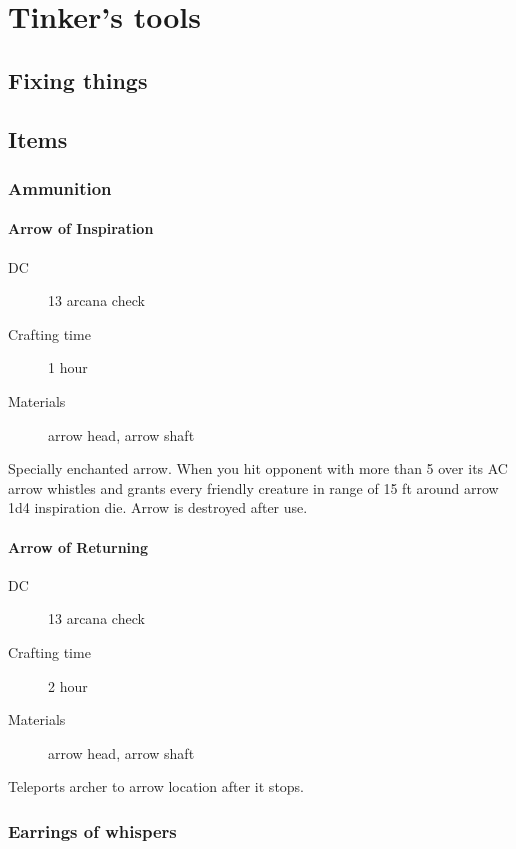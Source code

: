 \chapter{Tinker's tools}

\section{Fixing things}

\section{Items}

\subsection{Ammunition}

\subsubsection{Arrow of Inspiration}

\begin{description}
\item [DC] 13 arcana check
\item [Crafting time] 1 hour
\item [Materials] arrow head, arrow shaft
\end{description}

Specially enchanted arrow. When you hit opponent with more than 5 over its AC arrow whistles and grants every friendly creature in range of 15 ft around arrow 1d4 inspiration die. Arrow is destroyed after use.

\subsubsection{Arrow of Returning}

\begin{description}
\item [DC] 13 arcana check
\item [Crafting time] 2 hour
\item [Materials] arrow head, arrow shaft
\end{description}

Teleports archer to arrow location after it stops. 

\subsection{Earrings of whispers}


